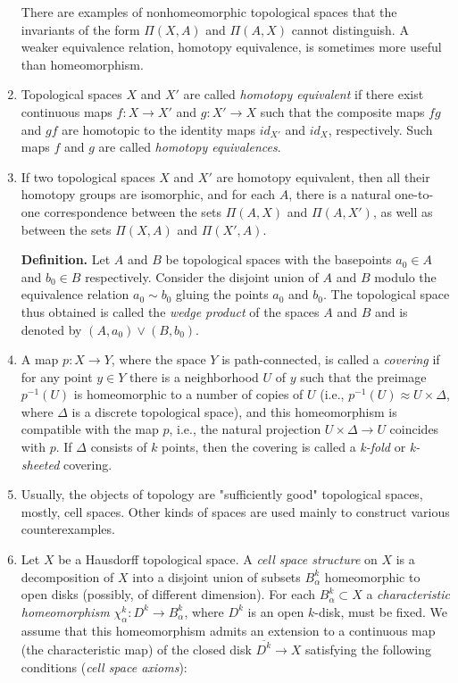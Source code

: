 \documentclass{ctexart}
\begin{document}
\begin{enumerate}
\qquad There are examples of nonhomeomorphic topological spaces that the invariants of the form $\Pi(X,A)$ and $\Pi(A,X)$ cannot distinguish. A weaker equivalence relation, homotopy equivalence, is sometimes more useful than homeomorphism.

\item Topological spaces $X$ and $X'$ are called \textit{homotopy
    equivalent} if there exist continuous maps $f : X \to X'$ and $g :
  X' \to X$ such that the composite maps $fg$ and $gf$ are homotopic
  to the identity maps $id_{X'}$ and $id_X$, respectively. Such maps $f$
  and $g$ are called \textit{homotopy equivalences}.

\item If two topological spaces $X$ and $X'$ are homotopy equivalent,
  then all their homotopy groups are isomorphic, and for each $A$,
  there is a natural one-to-one correspondence between the sets
  $\Pi(A,X)$ and $\Pi(A,X')$, as well as between the sets $\Pi(X,A)$
  and $\Pi(X',A)$.

\textbf{Definition.} Let $A$ and $B$ be topological spaces with the basepoints $a_0 \in A$ and $b_0 \in B$ respectively. Consider the disjoint union of $A$ and $B$ modulo the equivalence relation $a_0 \sim b_0$ gluing the points $a_0$ and $b_0$. The topological space thus obtained is called the \textit{wedge product} of the spaces $A$ and $B$ and is denoted by $(A,a_0) \vee (B,b_0)$.

\item A map $p : X \to Y$, where the space $Y$ is path-connected, is
  called a \textit{covering} if for any point $y \in Y$ there is a
  neighborhood $U$ of $y$ such that the preimage $p^{-1}(U)$ is
  homeomorphic to a number of copies of $U$ (i.e., $p^{-1}(U) \approx
  U \times \Delta$, where $\Delta$ is a discrete topological space),
  and this homeomorphism is compatible with the map $p$, i.e., the
  natural projection $U \times \Delta \to U$ coincides with $p$. If $\Delta$
  consists of $k$ points, then the covering is called a
  \textit{k-fold} or \textit{k-sheeted} covering.

\item Usually, the objects of topology are "sufficiently good"
  topological spaces, mostly, cell spaces. Other kinds of spaces are
  used mainly to construct various counterexamples.

\item Let $X$ be a Hausdorff topological space. A \textit{cell space
    structure} on $X$ is a decomposition of $X$ into a disjoint union
  of subsets $B_\alpha^k$ homeomorphic to open disks (possibly, of
  different dimension). For each $B_\alpha^k \subset X$ a
  \textit{characteristic homeomorphism} $\chi_\alpha^k : D^k \to
  B_\alpha^k$, where $D^k$ is an open $k$-disk, must be fixed. We
  assume that this homeomorphism admits an extension to a continuous
  map (the characteristic map) of the closed disk $\overline{D^k} \to X$
  satisfying the following conditions (\textit{cell space axioms}):


\end{enumerate}
\end{document}
